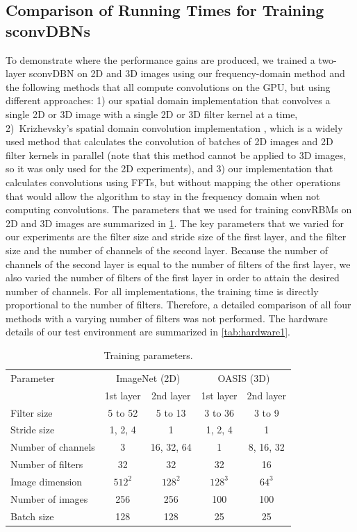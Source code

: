 \subsection{Comparison of Running Times for Training sconvDBNs}

To demonstrate where the performance gains are produced, we trained a two-layer
sconvDBN on 2D and 3D images using our frequency-domain method and the following
methods that all compute convolutions on the GPU, but using different
approaches: 1) our spatial domain implementation that convolves a single 2D or
3D image with a single 2D or 3D filter kernel at a time, 2)~Krizhevsky's spatial
domain convolution implementation \citep{Krizhevsky2012b}, which is a widely
used method \citep[e.g.,][]{scherer2010,hinton2012,zeiler2013} that calculates
the convolution of batches of 2D images and 2D filter kernels in parallel (note
that this method cannot be applied to 3D images, so it was only used for the 2D
experiments), and 3) our implementation that calculates convolutions using FFTs,
but without mapping the other operations that would allow the algorithm to stay
in the frequency domain when not computing convolutions. The parameters that we
used for training convRBMs on 2D and 3D images are summarized in
\ref{tab:parameters}. The key parameters that we varied for our experiments are
the filter size and stride size of the first layer, and the filter size and the
number of channels of the second layer. Because the number of channels of the
second layer is equal to the number of filters of the first layer, we also
varied the number of filters of the first layer in order to attain the desired
number of channels. For all implementations, the training time is directly
proportional to the number of filters. Therefore, a detailed comparison of all
four methods with a varying number of filters was not performed. The hardware
details of our test environment are summarized in \ref{tab:hardware1}.

\begin{table}
\centering
\caption{Training parameters.}
\begin{tabular}{lcccc}
\toprule
Parameter & \multicolumn{2}{c}{ImageNet (2D)} & \multicolumn{2}{c}{OASIS (3D)}
\\
\addlinespace
 & \multicolumn{1}{c}{1st layer} & \multicolumn{1}{c}{2nd layer} 
 & \multicolumn{1}{c}{1st layer} & \multicolumn{1}{c}{2nd layer} \\
\cmidrule(r){1-1} \cmidrule(lr){2-2} \cmidrule(lr){3-3} \cmidrule(lr){4-4}
\cmidrule(l){5-5}
Filter size & 5 to 52 & 5 to 13 & 3 to 36 & 3 to 9 \\
Stride size & 1, 2, 4 & 1 & 1, 2, 4 & 1 \\
Number of channels & 3 & 16, 32, 64 & 1 & 8, 16, 32 \\
Number of filters & 32 & 32 & 32 & 16 \\
Image dimension & $512^2$ & $128^2$ & $128^3$ & $64^3$ \\
Number of images & 256 & 256 & 100 & 100 \\
Batch size & 128 & 128 & 25 & 25 \\
\bottomrule
\end{tabular}
\label{tab:parameters}
\end{table}

